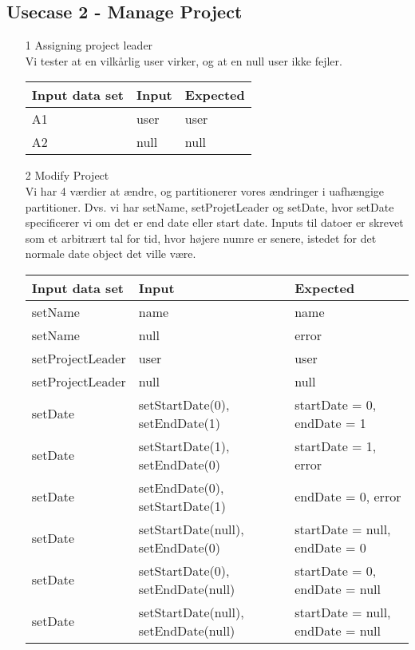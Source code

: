 \documentclass[a4paper,12pt]{article}
\begin{document}
\subsection{Usecase 2 - Manage Project}
\begin{enumerate}
	\item[1] Assigning project leader\\
		Vi tester at en vilkårlig user virker, og at en null user ikke fejler.
		\begin{center}
		\begin{tabular}{|l|l|l|}
			\hline
			Input data set & Input & Expected \\
			\hline
			A1 & user & user \\
			A2 & null & null \\
			\hline
		\end{tabular}
		\end{center}
	\item[2] Modify Project\\
		Vi har 4 værdier at ændre, og partitionerer vores ændringer i uafhængige partitioner. Dvs. vi har setName, setProjetLeader og setDate, hvor setDate specificerer vi om det er end date eller start date. Inputs til datoer er skrevet som et arbitrært tal for tid, hvor højere numre er senere, istedet for det normale date object det ville være.
		\begin{center}
		\begin{tabular}{|l|l|l|}
			\hline
			Input data set & Input & Expected \\
			\hline
			setName & name & name \\
			setName & null & error \\
			setProjectLeader & user & user \\
			setProjectLeader & null & null \\
			setDate & setStartDate(0), setEndDate(1) & startDate = 0, endDate = 1 \\
			setDate & setStartDate(1), setEndDate(0) & startDate = 1, error \\
			setDate & setEndDate(0), setStartDate(1) & endDate = 0, error \\
			setDate & setStartDate(null), setEndDate(0) & startDate = null, endDate = 0 \\
			setDate & setStartDate(0), setEndDate(null) & startDate = 0, endDate = null \\
			setDate & setStartDate(null), setEndDate(null) & startDate = null, endDate = null \\
			\hline

\end{tabular}
\end{center}
\end{enumerate}
\end{document}
